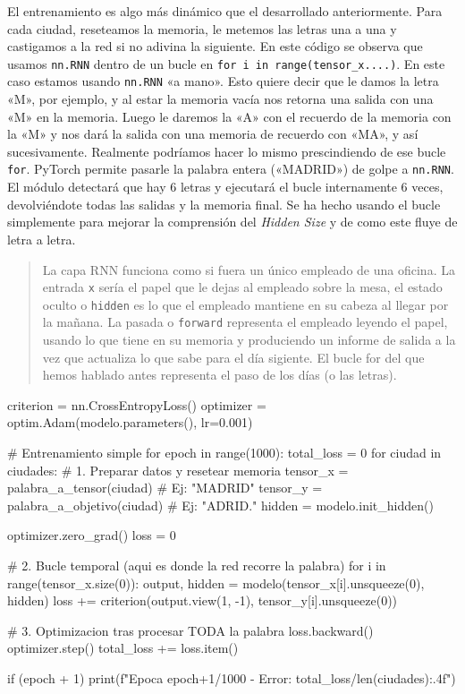 \documentclass[a4paper,11pt]{article}
\begin{document}
El entrenamiento es algo más dinámico que el desarrollado anteriormente.
Para cada ciudad, reseteamos la memoria, le metemos las letras una a una
y castigamos a la red si no adivina la siguiente. En este código se
observa que usamos \texttt{nn.RNN} dentro de un bucle en
\texttt{for\ i\ in\ range(tensor\_x....)}. En este caso estamos usando
\texttt{nn.RNN} «a mano». Esto quiere decir que le damos la letra «M»,
por ejemplo, y al estar la memoria vacía nos retorna una salida con una
«M» en la memoria. Luego le daremos la «A» con el recuerdo de la memoria
con la «M» y nos dará la salida con una memoria de recuerdo con «MA», y
así sucesivamente. Realmente podríamos hacer lo mismo prescindiendo de
ese bucle \texttt{for}. PyTorch permite pasarle la palabra entera
(«MADRID») de golpe a \texttt{nn.RNN}. El módulo detectará que hay 6
letras y ejecutará el bucle internamente 6 veces, devolviéndote todas
las salidas y la memoria final. Se ha hecho usando el bucle simplemente
para mejorar la comprensión del \emph{Hidden Size} y de como este fluye
de letra a letra.

\begin{quote}
La capa RNN funciona como si fuera un único empleado de una oficina. La
entrada \texttt{x} sería el papel que le dejas al empleado sobre la
mesa, el estado oculto o \texttt{hidden} es lo que el empleado mantiene
en su cabeza al llegar por la mañana. La pasada o \texttt{forward}
representa el empleado leyendo el papel, usando lo que tiene en su
memoria y produciendo un informe de salida a la vez que actualiza lo que
sabe para el día sigiente. El bucle for del que hemos hablado antes
representa el paso de los días (o las letras).
\end{quote}

\begin{codigo}
criterion = nn.CrossEntropyLoss()
optimizer = optim.Adam(modelo.parameters(), lr=0.001)

# Entrenamiento simple
for epoch in range(1000):
    total_loss = 0
    for ciudad in ciudades:
        # 1. Preparar datos y resetear memoria
        tensor_x = palabra_a_tensor(ciudad)          # Ej: "MADRID"
        tensor_y = palabra_a_objetivo(ciudad)        # Ej: "ADRID."
        hidden = modelo.init_hidden()
        
        optimizer.zero_grad()
        loss = 0
        
        # 2. Bucle temporal (aqui es donde la red recorre la palabra)
        for i in range(tensor_x.size(0)):
            output, hidden = modelo(tensor_x[i].unsqueeze(0), hidden)
            loss += criterion(output.view(1, -1), tensor_y[i].unsqueeze(0))
        
        # 3. Optimizacion tras procesar TODA la palabra
        loss.backward()
        optimizer.step()
        total_loss += loss.item()
    
    if (epoch + 1) %
        print(f"Epoca {epoch+1}/1000 - Error: {total_loss/len(ciudades):.4f}")
\end{codigo}
\end{document}
